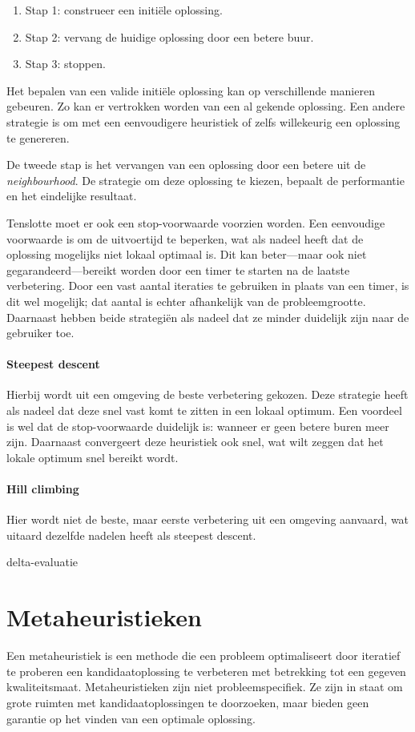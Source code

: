 %
\begin{enumerate}
    \item Stap 1: construeer een initi\"ele oplossing.
    \item Stap 2: vervang de huidige oplossing door een betere buur.
    \item Stap 3: stoppen.
\end{enumerate}
%

Het bepalen van een valide initi\"ele oplossing kan op verschillende manieren gebeuren. 
Zo kan er vertrokken worden van een al gekende oplossing. 
Een andere strategie is om met een eenvoudigere heuristiek of zelfs willekeurig een oplossing te genereren.

De tweede stap is het vervangen van een oplossing door een betere uit de \emph{neighbourhood}. 
De strategie om deze oplossing te kiezen, bepaalt de performantie en het eindelijke resultaat.

Tenslotte moet er ook een stop-voorwaarde voorzien worden. 
Een eenvoudige voorwaarde is om de uitvoertijd te beperken, wat als nadeel heeft dat de oplossing mogelijks niet lokaal optimaal is.
Dit kan beter---maar ook niet gegarandeerd---bereikt worden door een timer te starten na de laatste verbetering.
Door een vast aantal iteraties te gebruiken in plaats van een timer, is dit wel mogelijk; dat aantal is echter afhankelijk van de probleemgrootte. 
Daarnaast hebben beide strategi\"en als nadeel dat ze minder duidelijk zijn naar de gebruiker toe. 

\paragraph{Steepest descent}
Hierbij wordt uit een omgeving de beste verbetering gekozen. 
Deze strategie heeft als nadeel dat deze snel vast komt te zitten in een lokaal optimum. Een voordeel is wel dat de stop-voorwaarde duidelijk is: wanneer er geen betere buren meer zijn. Daarnaast convergeert deze heuristiek ook snel, wat wilt zeggen dat het lokale optimum snel bereikt wordt.

\paragraph{Hill climbing}
Hier wordt niet de beste, maar eerste verbetering uit een omgeving aanvaard, wat uitaard dezelfde nadelen heeft als steepest descent.

\TODO delta-evaluatie

\section{Metaheuristieken}
Een metaheuristiek is een methode die een probleem optimaliseert door iteratief te proberen een kandidaatoplossing te verbeteren met betrekking tot een gegeven kwaliteitsmaat. 
Metaheuristieken zijn niet probleemspecifiek. 
Ze zijn in staat om grote ruimten met kandidaatoplossingen te doorzoeken, maar bieden geen garantie op het vinden van een optimale oplossing.

